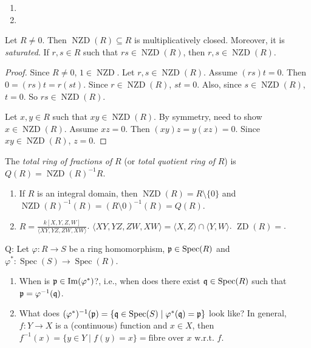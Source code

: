 \begin{example}
    \begin{enumerate}
        \item 
        \item 
    \end{enumerate}
\end{example}

\begin{proposition}
    Let $R \neq 0$. Then $\operatorname{NZD}(R) \subseteq R$ is multiplicatively closed. Moreover, it is \emph{saturated}. If $r,s \in R$ such that $rs \in \operatorname{NZD}(R)$, then $r,s \in \operatorname{NZD}(R)$.
\end{proposition}

\begin{proof}
    Since $R \neq 0$, $1 \in \operatorname{NZD}$. Let $r,s \in \operatorname{NZD}(R)$. Assume $(rs)t=0$. Then $0 = (rs)t = r(st)$. Since $r \in \operatorname{NZD}(R)$, $st = 0$. Also, since $s \in \operatorname{NZD}(R)$, $t = 0$. So $rs \in \operatorname{NZD}(R)$. \par 
    Let $x,y \in R$ such that $xy \in \operatorname{NZD}(R)$. By symmetry, need to show $x \in \operatorname{NZD}(R)$. Assume $xz = 0$. Then $(xy)z = y(xz) = 0$. Since $xy \in \operatorname{NZD}(R)$, $z = 0$.
\end{proof}

\begin{definition}
    The \emph{total ring of fractions of} $R$ (or \emph{total quotient ring of }$R$) is $Q(R) = \operatorname{NZD}(R)^{-1}R$.
\end{definition}

\begin{example}
    \begin{enumerate}
        \item If $R$ is an integral domain, then $\operatorname{NZD}(R) = R \setminus \{0\}$ and $\operatorname{NZD}(R)^{-1}(R) = (R \setminus 0)^{-1}(R) = Q(R)$.
        \item $R = \frac{k[X,Y,Z,W]}{\langle XY,YZ,ZW,XW \rangle}$. $\langle XY,YZ,ZW,XW \rangle = \langle X,Z \rangle \cap \langle Y,W \rangle$. $\operatorname{ZD}(R) = $.
    \end{enumerate}
\end{example}

\begin{proposition}
\end{proposition}


Q: Let $\varphi: R \to S$ be a ring homomorphism, $\mathfrak{p} \in \operatorname{Spec}(R)$ and $\varphi^*: \operatorname{Spec}(S) \to \operatorname{Spec}(R)$.
\begin{enumerate}
    \item When is $\mathfrak{p} \in \operatorname{Im}(\varphi^*)$?, i.e., when does there exist $\mathfrak{q} \in \operatorname{Spec}(R)$ such that $\mathfrak{p}  = \varphi^{-1}(\mathfrak{q})$.
    \item What does $(\varphi^*)^{-1}(\mathfrak{p}) = \{\mathfrak{q} \in \operatorname{Spec}(S) \mid \varphi^*(\mathfrak{q}) = \mathfrak{p}\}$ look like? In general, $f: Y \to X$ is a (continuous) function and $x \in X$, then $f^{-1}(x) = \{y \in Y \mid f(y) = x\} = \text{fibre over $x$ w.r.t. $f$}$.
\end{enumerate}

